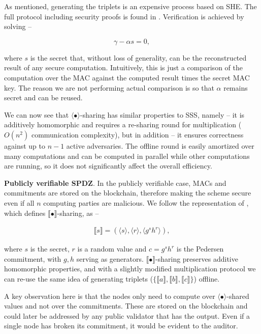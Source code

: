 \documentclass{article} \usepackage{nips13submit_e,times}
\begin{document}
As mentioned, generating the triplets is an expensive process based on SHE. The full protocol including security proofs is found in \cite{baum14}. Verification is achieved by solving --

\begin{equation}
	\gamma - \alpha s = 0,
\end{equation}

where $s$ is the secret that, without loss of generality, can be the reconstructed result of any secure computation. Intuitively, this is just a comparison of the computation over the MAC against the computed result times the secret MAC key. The reason we are not performing actual comparison is so that $\alpha$ remains secret and can be reused.

We can now see that $\langle \bullet \rangle$-sharing has similar properties to SSS, namely -- it is additively homomorphic and requires a re-sharing round for multiplication ($O(n^2)$ communication complexity), but in addition -- it ensures correctness against up to $n-1$ active adversaries. The offline round is easily amortized over many computations and can be computed in parallel while other computations are running, so it does not significantly affect the overall efficiency.


\textbf{Publicly verifiable SPDZ}. In the publicly verifiable case, MACs and commitments are stored on the blockchain, therefore making the scheme secure even if all $n$ computing parties are malicious. We follow the representation of \cite{baum14}, which defines $\llbracket \bullet \rrbracket$-sharing, as --

\begin{eqnarray}
	\llbracket s \rrbracket = (\langle s \rangle, \langle r \rangle, \langle g^s h^r \rangle),
\end{eqnarray}

where $s$ is the secret, $r$ is a random value and $c=g^s h^r$ is the Pedersen commitment, with $g,h$ serving as generators. $\llbracket \bullet \rrbracket$-sharing preserves additive homomorphic properties, and with a slightly modified multiplication protocol we can re-use the same idea of generating triplets ($\{ \llbracket a \rrbracket, \llbracket b \rrbracket, \llbracket c \rrbracket \}$) offline.

A key observation here is that the nodes only need to compute over $\langle \bullet \rangle$-shared values and not over the commitments. These are stored on the blockchain and could later be addressed by any public validator that has the output. Even if a single node has broken its commitment, it would be evident to the auditor.
\end{document}
